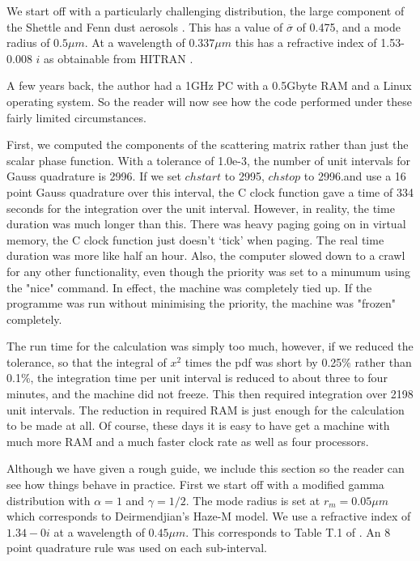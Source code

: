 \begin{flushleft}

We start off with a particularly challenging distribution, the large component
of the Shettle and Fenn dust aerosols \cite{ShettleFenn:Mybib}. This has
a value of $\overline \sigma$ of 0.475, and a mode radius of $0.5\mu m$.
At a wavelength of $0.337 \mu m$ this has a refractive index of 1.53-0.008 $i$
 as obtainable from  HITRAN \cite{RothmanETAL:Mybib}. 

A few years back, the  author had a 1GHz PC with a 0.5Gbyte RAM and a Linux
 operating system. So the reader
will now see how the code performed under these fairly limited circumstances.

First, we computed the components of the scattering matrix rather than just the
 scalar phase function.
With a tolerance of 1.0e-3, the number of unit intervals for Gauss quadrature
is 2996.  If we set $chstart$ to 2995, $chstop$ to 2996.and use a 16 point Gauss quadrature
 over this interval, the C clock function gave a time of 334 seconds for the 
integration over the unit interval. However, in reality, the time duration was much longer than this.
There was heavy paging going on in virtual memory, the C clock function
just doesn't `tick' when paging. The real time duration was more like half an hour.
 Also, the computer slowed down to a crawl for any other functionality, even though the priority
 was set to a minumum using the "nice" command. In effect, the machine was completely tied up.
 If the programme was run without minimising the priority, the machine was "frozen" completely. 

The run time for the calculation was simply too much, however, if we reduced the 
tolerance, so that the integral of $x^2$ times the pdf was short by 0.25\% rather
 than 0.1\%, the 
integration time per unit interval is reduced to about three to four minutes, and the 
machine did not freeze. This then required integration over 2198 unit intervals.
The reduction in required RAM is just enough for the calculation to be made at all. 
Of course, these days it is easy  to have get a machine with much more RAM and 
a much faster clock rate as well as four processors.


Although we have given a rough guide, we include this section so the reader
can see how things behave in practice. First we start off with a modified 
gamma distribution with $\alpha=1$ and $\gamma=1/2$. The mode radius is
set at $r_m=0.05 \mu m$ which corresponds to Deirmendjian's Haze-M model.
We use a refractive index of $1.34-0 i$ at a wavelength of $0.45 \mu m$. This corresponds to Table T.1
of \cite{Deirmendjian:Mybib}. An 8 point quadrature rule 
was used on each sub-interval.


\end{flushleft}
